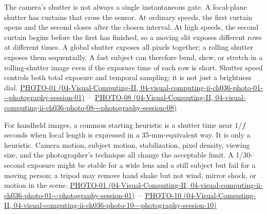 The camera's shutter is not always a single instantaneous gate. A focal-plane shutter has curtains that cross the sensor. At ordinary speeds, the first curtain opens and the second closes after the chosen interval. At high speeds, the second curtain begins before the first has finished, so a moving slit exposes different rows at different times. A global shutter exposes all pixels together; a rolling shutter exposes them sequentially. A fast subject can therefore bend, skew, or stretch in a rolling-shutter image even if the exposure time of each row is short. Shutter speed controls both total exposure and temporal sampling; it is not just a brightness dial. \href{../04-Visual-Computing-II/main.pdf\#nameddest=04-visual-computing-ii-ch036-photo-01---photography-session-01}{PHOTO-01 (04-Visual-Computing-II, 04-visual-computing-ii-ch036-photo-01-\/-\/-photography-session-01)} · \href{../04-Visual-Computing-II/main.pdf\#nameddest=04-visual-computing-ii-ch036-photo-08---photography-session-08}{PHOTO-08 (04-Visual-Computing-II, 04-visual-computing-ii-ch036-photo-08-\/-\/-photography-session-08)}

For handheld images, a common starting heuristic is a shutter time near \(1/f\) seconds when focal length is expressed in a 35-mm-equivalent way. It is only a heuristic. Camera motion, subject motion, stabilization, pixel density, viewing size, and the photographer's technique all change the acceptable limit. A 1/30-second exposure might be stable for a wide lens and a still subject but fail for a moving person; a tripod may remove hand shake but not wind, mirror shock, or motion in the scene. \href{../04-Visual-Computing-II/main.pdf\#nameddest=04-visual-computing-ii-ch036-photo-01---photography-session-01}{PHOTO-01 (04-Visual-Computing-II, 04-visual-computing-ii-ch036-photo-01-\/-\/-photography-session-01)} · \href{../04-Visual-Computing-II/main.pdf\#nameddest=04-visual-computing-ii-ch036-photo-10---photography-session-10}{PHOTO-10 (04-Visual-Computing-II, 04-visual-computing-ii-ch036-photo-10-\/-\/-photography-session-10)}

